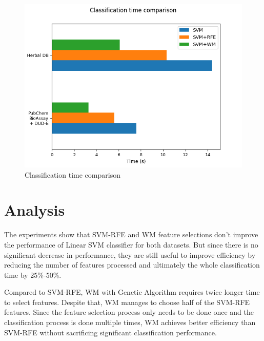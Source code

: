 \documentclass[conference]{IEEEtran}
\begin{document}
\begin{figure}
	\includegraphics[scale=0.5]{../images/classification_time_comparison.png}
	\caption{Classification time comparison}
	\label{fig_classification_time_comparison}
\end{figure}

\section{Analysis}

The experiments show that SVM-RFE and WM feature selections don't improve the performance of Linear SVM classifier for both datasets. But since there is no significant decrease in performance, they are still useful to improve efficiency by reducing the number of features processed and ultimately the whole classification time by 25\%-50\%.

Compared to SVM-RFE, WM with Genetic Algorithm requires twice longer time to select features. Despite that, WM manages to choose half of the SVM-RFE features. Since the feature selection process only needs to be done once and the classification process is done multiple times, WM achieves better efficiency than SVM-RFE without sacrificing significant classification performance.
\end{document}
